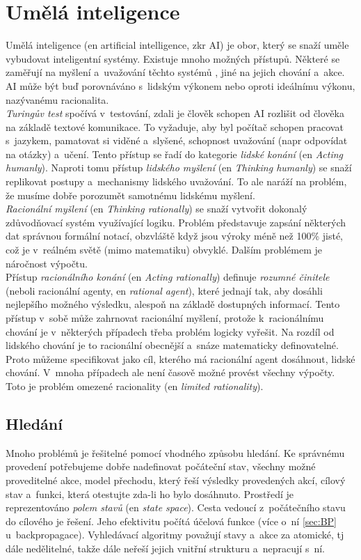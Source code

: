 \documentclass[12pt,oneside]{report}			%
\begin{document}
	\chapter{Umělá inteligence}
	\label{sec:AI}
	Umělá inteligence (\gls{en} artificial intelligence, \gls{zkr} \gls{AI}) je obor, který se snaží uměle vybudovat inteligentní systémy. Existuje mnoho možných přístupů. Některé se zaměřují na myšlení a~uvažování těchto systémů , jiné na jejich chování a~akce. \gls{AI} může být buď porovnáváno s~lidským výkonem nebo oproti ideálnímu výkonu, nazývanému racionalita.\\
	\emph{Turingův test} spočívá v~testování, zdali je člověk schopen \gls{AI} rozlišit od člověka na základě textové komunikace. To vyžaduje, aby byl počítač schopen pracovat s~jazykem, pamatovat si viděné a~slyšené, schopnost uvažování (\gls{napr} odpovídat na otázky) a~učení. Tento přístup se řadí do kategorie \emph{lidské konání} (\gls{en} \emph{Acting humanly}). Naproti tomu přístup \emph{lidského myšlení }(\gls{en} \emph{Thinking humanly}) se snaží replikovat postupy a~mechanismy lidského uvažování. To ale naráží na problém, že musíme dobře porozumět samotnému lidskému myšlení.\\
	\emph{Racionální myšlení} (\gls{en} \emph{Thinking rationally}) se snaží vytvořit dokonalý zdůvodňovací systém využívající logiku. Problém představuje zapsání některých dat správnou formální notací, obzvláště když jsou výroky méně než 100\% jisté, což je v~reálném světě (mimo matematiku) obvyklé. Dalším problémem je náročnost výpočtu.\\
	 Přístup \emph{racionálního konání} (\gls{en} \emph{Acting rationally}) definuje \emph{rozumné činitele} (neboli racionální agenty, \gls{en} \emph{rational agent}), které jednají tak, aby dosáhli nejlepšího možného výsledku, alespoň na základě dostupných informací. Tento přístup v~sobě může zahrnovat racionální myšlení, protože k~racionálnímu chování je v~některých případech třeba problém logicky vyřešit. Na rozdíl od lidského chování je to racionální obecnější a~snáze matematicky definovatelné. Proto můžeme specifikovat jako cíl, kterého má racionální agent dosáhnout, lidské chování. V~mnoha případech ale není časově možné provést všechny výpočty. Toto je problém omezené racionality (\gls{en} \emph{limited rationality}).
	\parencite[\gls{s} 1-5,29-30]{AIAMA}


	\section{Hledání}
	\label{sec:search}	
	Mnoho problémů je řešitelné pomocí vhodného způsobu hledání. Ke správnému provedení potřebujeme dobře nadefinovat počáteční stav, všechny možné proveditelné akce, model přechodu, který řeší výsledky provedených akcí, cílový stav a~funkci, která otestujte zda-li ho bylo dosáhnuto. Prostředí je reprezentováno \emph{polem stavů} (\gls{en} \emph{state space}). Cesta vedoucí z~počátečního stavu do cílového je řešení. Jeho efektivitu počítá účelová funkce (více o~ní \ref{sec:BP} u~backpropagace). Vyhledávací algoritmy považují stavy a~akce za atomické, \gls{tj} dále nedělitelné, takže dále neřeší jejich vnitřní strukturu a~nepracují s~ní.\parencite[\gls{str}]{AIAMA}
	
\end{document}

